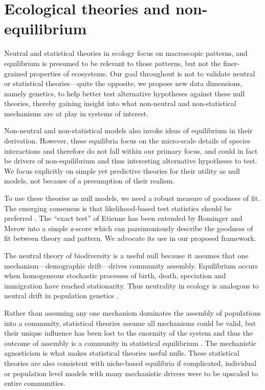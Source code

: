 \documentclass[12pt]{article}
\begin{document}
\section{Ecological theories and non-equilibrium}

Neutral and statistical theories in ecology focus on macroscopic
patterns, and equilibrium is presumed to be relevant to those
patterns, but not the finer-grained properties of
ecosystems. Our goal throughout is not to validate neutral or statistical
theories---quite the opposite, we propose new data dimensions, namely
genetics, to help better test alternative hypotheses against these
null theories, thereby gaining insight into what non-neutral and
non-statistical mechanisms are at play in systems of interest.

Non-neutral and non-statistical models \citep[e.g.,][]{tilman2004,
  chesson2000} also invoke ideas of equilibrium in their
derivation. However, these equilibria focus on the micro-scale details
of species interactions and therefore do not fall within our primary
focus, and could in fact be drivers of non-equilibrium and thus
interesting alternative hypotheses to test.  We focus explicitly on
simple yet predictive theories for their utility as null models, not
because of a presumption of their realism.

To use these theories as null models, we need a robust measure of
goodness of fit. The emerging consensus is that likelihood-based test
statistics should be preferred \citep{baldridge2016}. The ``exact
test'' of Etienne \citep{etienne2007} has been extended by Rominger
and Merow \citep{meteR} into a simple z-score which can parsimoniously
describe the goodness of fit between theory and pattern.  We advocate
its use in our proposed framework.

The neutral theory of biodiversity \citep[NTB;][]{hubbell2001} is a
useful null because it assumes that one mechanism---demographic
drift---drives community assembly.  Equilibrium occurs when
homogeneous stochastic processes of birth, death, speciation and
immigration have reached stationarity. Thus neutrality in ecology is
analogous to neutral drift in population genetics \citep{hubbell2001}.

Rather than assuming any one mechanism dominates the assembly of
populations into a community, statistical theories assume all
mechanisms could be valid, but their unique influence has been lost to
the enormity of the system and thus the outcome of assembly is a
community in statistical equilibrium \citep{harte2011, pueyo2007}. The
mechanistic agnosticism is what makes statistical theories useful
nulls. These statistical theories are also consistent with niche-based
equilibria \citep{pueyo2007, neill2009} if complicated, individual or
population level models with many mechanistic drivers were to be
upscaled to entire communities.
\end{document}
